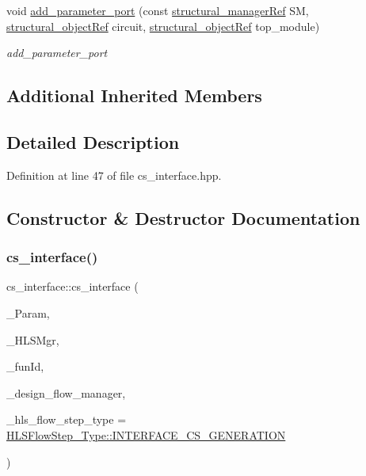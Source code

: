 \begin{DoxyCompactItemize}
void \hyperlink{classcs__interface_ab357b22ce264cfcbf7c82e74b5c7259d}{add\+\_\+parameter\+\_\+port} (const \hyperlink{structural__manager_8hpp_ab3136f0e785d8535f8d252a7b53db5b5}{structural\+\_\+manager\+Ref} SM, \hyperlink{structural__objects_8hpp_a8ea5f8cc50ab8f4c31e2751074ff60b2}{structural\+\_\+object\+Ref} circuit, \hyperlink{structural__objects_8hpp_a8ea5f8cc50ab8f4c31e2751074ff60b2}{structural\+\_\+object\+Ref} top\+\_\+module)
\begin{DoxyCompactList}\small\item\em add\+\_\+parameter\+\_\+port \end{DoxyCompactList}\end{DoxyCompactItemize}
\subsection*{Additional Inherited Members}


\subsection{Detailed Description}


Definition at line 47 of file cs\+\_\+interface.\+hpp.



\subsection{Constructor \& Destructor Documentation}
\mbox{\label{classcs__interface_af38b59ad1f1825bbed19763af1fbec6c}} 
\subsubsection{\texorpdfstring{cs\+\_\+interface()}{cs\_interface()}}
{\footnotesize\ttfamily cs\+\_\+interface\+::cs\+\_\+interface (\begin{DoxyParamCaption}\item[{const \hyperlink{Parameter_8hpp_a37841774a6fcb479b597fdf8955eb4ea}{Parameter\+Const\+Ref}}]{\+\_\+\+Param,  }\item[{const \hyperlink{hls__manager_8hpp_acd3842b8589fe52c08fc0b2fcc813bfe}{H\+L\+S\+\_\+manager\+Ref}}]{\+\_\+\+H\+L\+S\+Mgr,  }\item[{unsigned int}]{\+\_\+fun\+Id,  }\item[{const Design\+Flow\+Manager\+Const\+Ref}]{\+\_\+design\+\_\+flow\+\_\+manager,  }\item[{const \hyperlink{hls__step_8hpp_ada16bc22905016180e26fc7e39537f8d}{H\+L\+S\+Flow\+Step\+\_\+\+Type}}]{\+\_\+hls\+\_\+flow\+\_\+step\+\_\+type = {\ttfamily \hyperlink{hls__step_8hpp_ada16bc22905016180e26fc7e39537f8dae84ca7940ca856e25643ed54e0dc0f9a}{H\+L\+S\+Flow\+Step\+\_\+\+Type\+::\+I\+N\+T\+E\+R\+F\+A\+C\+E\+\_\+\+C\+S\+\_\+\+G\+E\+N\+E\+R\+A\+T\+I\+ON}} }\end{DoxyParamCaption})}




